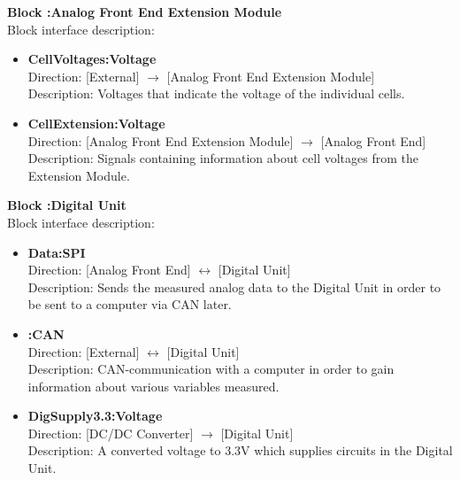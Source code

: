 \textbf{Block :Analog Front End Extension Module}\\
Block interface description:
\begin{itemize}
	\item \textbf{CellVoltages:Voltage}\\
	Direction: [External] $\rightarrow$ [Analog Front End Extension Module]\\
	Description: Voltages that indicate the voltage of the individual cells.
	\item \textbf{CellExtension:Voltage}\\
	Direction: [Analog Front End Extension Module] $\rightarrow$ [Analog Front End]\\
	Description: Signals containing information about cell voltages from the Extension Module. 
\end{itemize}

\textbf{Block :Digital Unit}\\
Block interface description:
\begin{itemize}
	\item \textbf{Data:SPI}\\
	Direction: [Analog Front End] $\leftrightarrow$ [Digital Unit]\\
	Description: Sends the measured analog data to the Digital Unit in order to be sent to a computer via CAN later.
	\item \textbf{:CAN}\\
	Direction: [External] $\leftrightarrow$ [Digital Unit]\\
	Description: CAN-communication with a computer in order to gain information about various variables measured.
	\item \textbf{DigSupply3.3:Voltage}\\
	Direction: [DC/DC Converter] $\rightarrow$ [Digital Unit]\\
	Description: A converted voltage to 3.3V which supplies circuits in the Digital Unit. 
\end{itemize}

